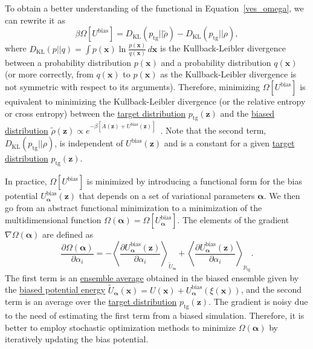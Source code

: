 \documentclass[9pt,review]{livecoms}
\newcommand{\vx}{\mathbf{x}}
\newcommand{\vz}{\mathbf{z}}
\begin{document}
To obtain a better understanding of the functional in Equation~\ref{ves_omega}, we can rewrite it as~\cite{Valsson2020Handbook_VES,Invernizzi-PNAS-2017}
\begin{equation}
\beta \Omega [U^{\mathrm{bias}}] = D_{\mathrm{KL}}(p_{\mathrm{tg}}||\tilde{\rho})-D_{\mathrm{KL}}(p_{\mathrm{tg}}||\rho),
\end{equation}
where $D_{\mathrm{KL}}(p||q)=\int p(\vx) \ln\frac{p(\vx)}{q(\vx)} \, d\vx$ is the Kullback-Leibler divergence between a probability distribution $p(\vx)$ and a probability distribution $q(\vx)$ (or more correctly, from  $q(\vx)$ to  $p(\vx)$ as the Kullback-Leibler divergence is not symmetric with respect to its arguments). Therefore, minimizing $\Omega [U^{\mathrm{bias}}]$ is equivalent to minimizing the Kullback-Leibler divergence (or the relative entropy or cross entropy) between the \hyperlink{ref:targetdist}{target distribution} $p_{\mathrm{tg}}(\vz)$ and the \hyperlink{ref:BiasedCVDist} {biased distribution} $\tilde{\rho}(\vz) \propto e^{-\beta \left[A(\vz) + U^\mathrm{bias}(\vz)\right]}$~\cite{Rubinstein-MetCompAppProb-1999,Shell-JCP-2008,Bilionis-JCompPhys-2012,Zhang_SIAM-JSC-2014}. Note that the second term, $D_{\mathrm{KL}}(p_{\mathrm{tg}}||\rho)$, is independent of $U^{\mathrm{bias}}(\vz)$ and is a constant for a given \hyperlink{ref:targetdist}{target distribution} $p_{\mathrm{tg}}(\vz)$.


In practice, $\Omega [U^{\mathrm{bias}}]$ is minimized by introducing a functional form for the bias potential $U_{\boldsymbol{\alpha}}^\mathrm{bias}(\vz)$ that depends on a set of variational parameters $\boldsymbol{\alpha}$. We then go from an abstract functional minimization to a minimization of the multidimensional function $\Omega(\boldsymbol{\alpha}) = \Omega [U_{\boldsymbol{\alpha}}^{\mathrm{bias}}]$. The elements of the gradient $\nabla \Omega(\boldsymbol{\alpha})$ are defined as
\begin{equation}
\frac
{\partial \Omega({\boldsymbol{\alpha}})}
{\partial \alpha_{i}}
 = -
\left<
\frac
{\partial U_{\boldsymbol{\alpha}}^{\mathrm{bias}}(\vz)}
{\partial \alpha_{i}}
\right>_{\tilde{U}_{\boldsymbol{\alpha}}}
+
\left<
\frac
{\partial U_{\boldsymbol{\alpha}}^{\mathrm{bias}}(\vz)}
{\partial \alpha_{i}}
\right>_{p_{\mathrm{tg}}}.
\end{equation}
The first term is an \hyperlink{ref:ensemble_average} {ensemble average} obtained in the biased ensemble given by the
\hyperlink{ref:biasingE}{biased potential energy} $\tilde{U}_{\boldsymbol{\alpha}}(\vx) = U(\vx) + U_{\boldsymbol{\alpha}}^{\mathrm{bias}}(\xi(\vx))$, and the second term is an average over the \hyperlink{ref:targetdist}{target distribution} $p_{\mathrm{tg}}(\vz)$.  The gradient is noisy due to the need of estimating the first term from a biased simulation. Therefore, it is better to employ stochastic optimization methods to minimize $\Omega({\boldsymbol{\alpha}})$ by iteratively updating the bias potential.
\end{document}
